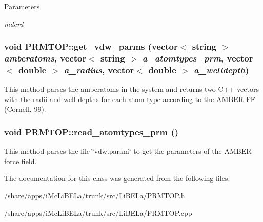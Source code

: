 \begin{DoxyParams}{Parameters}
\item[{\em mdcrd}]\end{DoxyParams}
\hypertarget{classPRMTOP_a449bb48040f0ceea40407dd94f993a04}{
\subsubsection[{get\_\-vdw\_\-parms}]{\setlength{\rightskip}{0pt plus 5cm}void PRMTOP::get\_\-vdw\_\-parms (vector$<$ string $>$ {\em amberatoms}, \/  vector$<$ string $>$ {\em a\_\-atomtypes\_\-prm}, \/  vector$<$ double $>$ {\em a\_\-radius}, \/  vector$<$ double $>$ {\em a\_\-welldepth})}}
\label{classPRMTOP_a449bb48040f0ceea40407dd94f993a04}
This method parses the amberatoms in the system and returns two C++ vectors with the radii and well depths for each atom type according to the AMBER FF (Cornell, 99). \hypertarget{classPRMTOP_ad460d8f9f6cf96b053771c2a3e098f58}{
\subsubsection[{read\_\-atomtypes\_\-prm}]{\setlength{\rightskip}{0pt plus 5cm}void PRMTOP::read\_\-atomtypes\_\-prm ()}}
\label{classPRMTOP_ad460d8f9f6cf96b053771c2a3e098f58}
This method parses the file \char`\"{}vdw.param\char`\"{} to get the parameters of the AMBER force field. 

The documentation for this class was generated from the following files:\begin{DoxyCompactItemize}
\item 
/share/apps/iMcLiBELa/trunk/src/LiBELa/PRMTOP.h\item 
/share/apps/iMcLiBELa/trunk/src/LiBELa/PRMTOP.cpp\end{DoxyCompactItemize}
